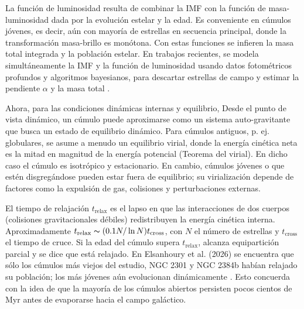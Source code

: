     La función de luminosidad resulta de combinar la IMF con la función de 
    masa-luminosidad dada por la evolución estelar y la edad. Es conveniente en 
    cúmulos jóvenes, es decir, aún con mayoría de estrellas en secuencia 
    principal, donde la transformación masa-brillo es monótona. Con estas 
    funciones se infieren la masa total integrada y la población estelar. En 
    trabajos recientes, se modela simultáneamente la IMF y la función de 
    luminosidad usando datos fotométricos profundos y algoritmos bayesianos, 
    para descartar estrellas de campo y estimar la pendiente $\alpha$ y la masa 
    total \cite{Elsanhoury2026}\cite{cantat2018gaia}.

    Ahora, para las condiciones dinámicas internas y equilibrio, Desde el punto 
    de vista dinámico, un cúmulo puede aproximarse como un sistema 
    auto-gravitante que busca un estado de equilibrio dinámico. Para cúmulos 
    antiguos, p. ej. globulares, se asume a menudo un equilibrio virial, donde 
    la energía cinética neta es la mitad en magnitud de la energía potencial 
    (Teorema del virial). En dicho caso el cúmulo es isotrópico y estacionario. 
    En cambio, cúmulos jóvenes o que estén disgregándose pueden estar fuera de 
    equilibrio; su virialización depende de factores como la expulsión de gas, 
    colisiones y perturbaciones externas.

    El tiempo de relajación $t_\text{relax}$ es el lapso en que las 
    interacciones de dos cuerpos (colisiones gravitacionales débiles) 
    redistribuyen la energía cinética interna. Aproximadamente $t_\text{relax} 
    \thicksim (0.1N /\ln N)t_\text{cross}$, con $N$ el número de estrellas y 
    $t_\text{cross}$ el tiempo de cruce. Si la edad del cúmulo supera 
    $t_\text{relax}$, alcanza equipartición parcial y se dice que está relajado. 
    En Elsanhoury et al. (2026) se encuentra que sólo los cúmulos más viejos del 
    estudio, NGC 2301 y NGC 2384b habían relajado su población; los más jóvenes 
    aún evolucionan dinámicamente \cite{Elsanhoury2026}. Esto concuerda con la 
    idea de que la mayoría de los cúmulos abiertos persisten pocos cientos de 
    Myr antes de evaporarse hacia el campo galáctico.

